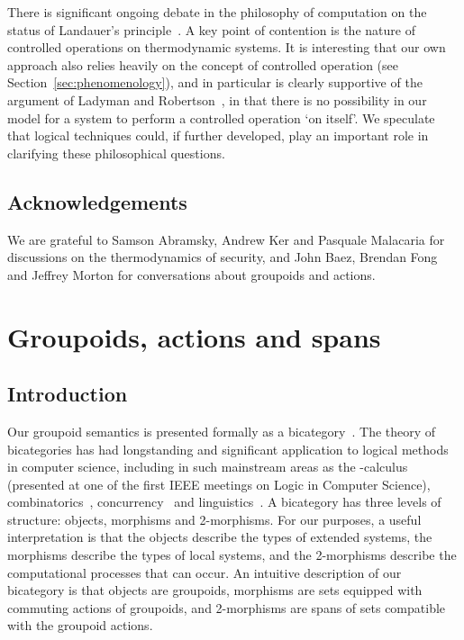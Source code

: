 \documentclass[a4paper,12pt]{article}
\theoremstyle{definition}
\renewcommand{\-}[0]{\nobreakdash-\hspace{0pt}}
\begin{document}
There is significant ongoing debate in the philosophy of computation on the status of Landauer's principle~\cite{lps08, lr13-ld, n11-wfl}. A key point of contention is the nature of controlled operations on thermodynamic systems. It is interesting that our own approach also relies heavily on the concept of controlled operation (see Section~\ref{sec:phenomenology}), and in particular is clearly supportive of the argument of Ladyman and Robertson~\cite[Section 4]{lr13-ld}, in that there is no possibility in our model for a system to perform a controlled operation `on itself'. We speculate that logical techniques could, if further developed, play an important role in clarifying these philosophical questions.

\subsection{Acknowledgements}

\noindent
We are grateful to Samson Abramsky, Andrew Ker and Pasquale Malacaria for discussions on the thermodynamics of security, and John Baez, Brendan Fong and Jeffrey Morton for conversations about groupoids and actions.

\section{Groupoids, actions and spans}
\label{sec:2category}

\subsection{Introduction}

\noindent
Our groupoid semantics is presented formally as a bicategory~\cite{borceux, ml97-cwm}. The theory of bicategories has had longstanding and significant application to logical methods in computer science, including in such mainstream areas as the \-calculus~\cite{seely} (presented at one of the first IEEE meetings on Logic in Computer Science), combinatorics~\cite{bicategoryspecies}, concurrency~\cite{presheafpi} and linguistics~\cite{lambek}.
A bicategory has three levels of structure: objects, morphisms and 2-morphisms. For our purposes, a useful interpretation is that the objects describe the types of extended systems, the morphisms describe the types of local systems, and the 2\-morphisms describe the computational processes that can occur. An intuitive description of our bicategory is that objects are groupoids, morphisms are sets equipped with commuting actions of groupoids, and 2\-morphisms are spans of sets compatible with the groupoid actions.
\end{document}
